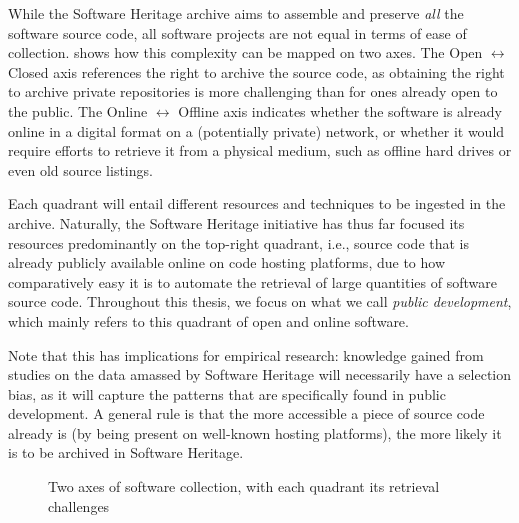 While the Software Heritage archive aims to assemble and preserve \emph{all}
the software source code, all software projects are not equal in terms of ease of
collection.  shows how this complexity can be
mapped on two axes. The Open $\leftrightarrow$ Closed axis references the right
to archive the source code, as obtaining the right to archive private
repositories is more challenging than for ones already open to the public.  The
Online $\leftrightarrow$ Offline axis indicates whether the software is already
online in a digital format on a (potentially private) network, or whether it
would require efforts to retrieve it from a physical medium, such as offline
hard drives or even old source listings.

Each quadrant will entail different resources and techniques to be ingested in
the archive. Naturally, the Software Heritage initiative has thus far focused
its resources predominantly on the top-right quadrant, i.e., source code that is
already publicly available online on code hosting platforms, due to how
comparatively easy it is to automate the retrieval of large quantities of
software source code.  Throughout this thesis, we focus on what we call
\emph{public development}, which mainly refers to this quadrant of open and
online software.

Note that this has implications for empirical research: knowledge gained from
studies on the data amassed by Software Heritage will necessarily have a
selection bias, as it will capture the patterns that are specifically
found in public development. A general rule is that the more accessible a
piece of source code already is (by being present on well-known hosting
platforms), the more likely it is to be archived in Software Heritage.

\begin{figure}
    \centering
    \caption{Two axes of software collection, with each quadrant its
    retrieval challenges}%
    \label{fig:swh-collect-axes}
\end{figure}

